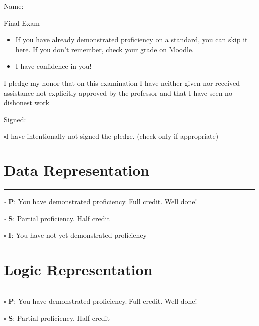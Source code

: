 \documentclass[12pt]{article}
\begin{document}
Name: \makebox[3in]{\hrulefill
\hrulefill}

\vfill

\begin{center}
{\huge Final Exam}
\end{center}

\begin{itemize}
    \item If you have already demonstrated proficiency on a standard, you can skip it here. If you don't remember, check your grade on Moodle.
    \item I have confidence in you!
\end{itemize}

\vfill

I pledge my honor that on this examination I have neither given nor received assistance not explicitly approved by the professor and that I have seen no dishonest work 

\hfill Signed: \makebox[3in]{\hrulefill}

$\square$\quad I have intentionally not signed the pledge. (check only if appropriate)
\newpage


\section*{Data Representation}

\vfill

\rule[1ex]{\textwidth}{.1pt}

$\square$ \textbf{P}: You have demonstrated proficiency. Full credit. Well done!

$\square$ \textbf{S}: Partial proficiency. Half credit

$\square$ \textbf{I}: You have not yet demonstrated proficiency

\newpage



\section*{Logic Representation}

\vfill

\rule[1ex]{\textwidth}{.1pt}

$\square$ \textbf{P}: You have demonstrated proficiency. Full credit. Well done!

$\square$ \textbf{S}: Partial proficiency. Half credit
\end{document}
